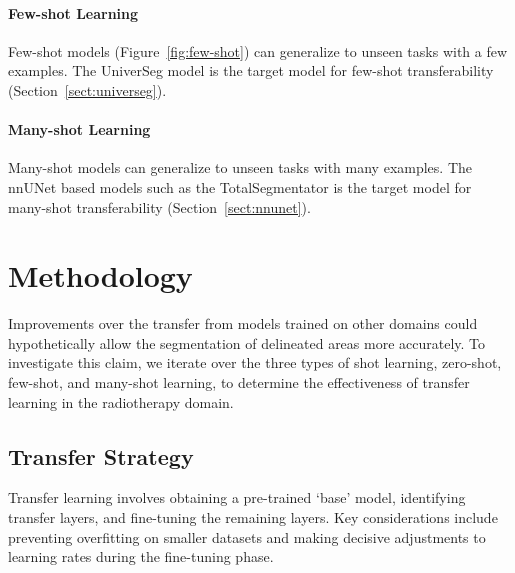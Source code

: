 \documentclass[11pt,twoside]{report}
\begin{document}
\subsubsection{Few-shot Learning}\label{sect:few-shot-learning}

Few-shot models (Figure~\ref{fig:few-shot}) can generalize to unseen tasks with a few examples. The UniverSeg model is the target model for few-shot transferability (Section~\ref{sect:universeg}).

\subsubsection{Many-shot Learning}\label{sect:many-shot-learning}

Many-shot models can generalize to unseen tasks with many examples. The nnUNet based models such as the TotalSegmentator is the target model for many-shot transferability (Section~\ref{sect:nnunet}).

\chapter{Methodology}\label{sect:methodology}

Improvements over the transfer from models trained on other domains could hypothetically allow the segmentation of delineated areas more accurately. To investigate this claim, we iterate over the three types of shot learning, zero-shot, few-shot, and many-shot learning, to determine the effectiveness of transfer learning in the radiotherapy domain.

\section{Transfer Strategy}

Transfer learning involves obtaining a pre-trained `base' model, identifying transfer layers, and fine-tuning the remaining layers. Key considerations include preventing overfitting on smaller datasets and making decisive adjustments to learning rates during the fine-tuning phase.
\end{document}
